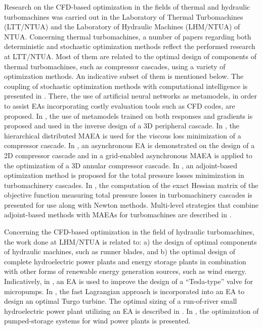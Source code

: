 Research on the CFD-based optimization in the fields of thermal and hydraulic turbomachines was carried out in the Laboratory of Thermal Turbomachines (LTT/NTUA) and the Laboratory of Hydraulic Machines (LHM/NTUA) of NTUA. 
Concerning thermal turbomachines, a number of papers regarding both deterministic and stochastic optimization methods reflect the performed research at LTT/NTUA. Most of them are related to the optimal design of components of thermal turbomachines, such as compressor cascades, using a variety of optimization methods.  An indicative subset of them is mentioned below. The coupling of stochastic optimization methods with computational intelligence is presented in \cite{LTT_2_018,LTT_2_020,LTT_2_023}. There, the use of artificial neural networks as metamodels, in order to assist  EAs incorporating costly evaluation tools such as CFD codes, are proposed. In \cite{LTT_2_026}, the use of metamodels trained  on both responses and gradients is proposed and used in the inverse design of a 3D peripheral cascade. In \cite{LTT_2_031}, the hierarchical distributed MAEA is used for the viscous loss minimization of a compressor cascade. In \cite{LTT_2_040}, an asynchronous EA is demonstrated on the  design of a 2D compressor cascade and in \cite{LTT_2_045} a grid-enabled asynchronous MAEA is applied to the optimization of a 3D annular compressor cascade. In \cite{LTT_2_032}, an adjoint-based optimization method is proposed for the total pressure losses minimization in turbomachinery cascades.  In \cite{LTT_2_049},  the computation of the exact Hessian matrix of the objective function measuring total pressure losses in turbomachinery cascades is presented for use along with Newton methods. Multi-level strategies that combine adjoint-based methods with MAEAs for turbomachines are described in \cite{LTT_3_092}.


Concerning the CFD-based optimization in the field of hydraulic turbomachines, the work done at LHM/NTUA is related to: a) the design of optimal components of hydraulic machines, such as runner blades, and b) the optimal design of complete hydroelectric power plants and energy storage plants in combination with other forms of renewable energy generation sources, such as wind energy. Indicatively, in \cite{Anagno2}, an EA is used to improve the design of a ``Tesla-type'' valve for micropumps. In \cite{Anagno4}, the fast Lagrangian approach is incorporated into an EA to design an optimal Turgo turbine. The optimal sizing of a run-of-river small hydroelectric power plant utilizing an EA is described in \cite{Anagno3}. In \cite{Anagno5,Anagno6}, the optimization of pumped-storage systems for wind power plants is presented.

